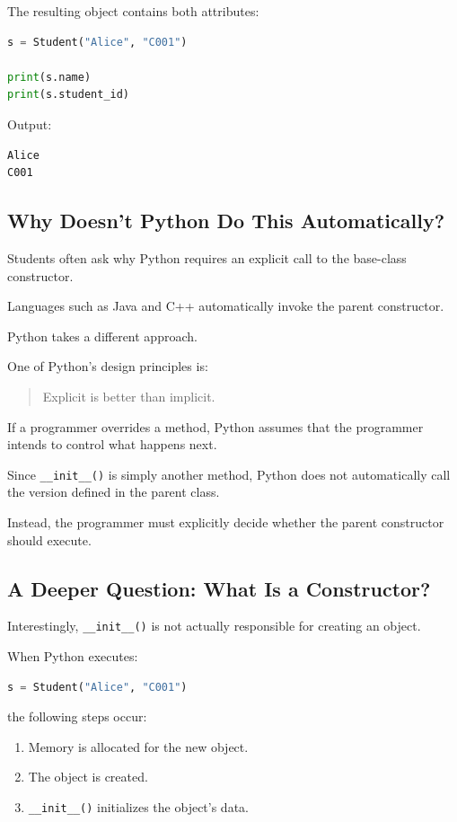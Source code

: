 \documentclass[11pt]{article}
\begin{document}
The resulting object contains both attributes:

\begin{lstlisting}[language=Python]
s = Student("Alice", "C001")

print(s.name)
print(s.student_id)
\end{lstlisting}

Output:

\begin{verbatim}
Alice
C001
\end{verbatim}

\subsection{Why Doesn’t Python Do This Automatically?}

Students often ask why Python requires an explicit call to the base-class constructor.

Languages such as Java and C++ automatically invoke the parent constructor.

Python takes a different approach.

One of Python’s design principles is:

\begin{quote}
Explicit is better than implicit.
\end{quote}

If a programmer overrides a method, Python assumes that the programmer intends to control what happens next.

Since \verb|__init__()| is simply another method, Python does not automatically call the version defined in the parent class.

Instead, the programmer must explicitly decide whether the parent constructor should execute.

\subsection{A Deeper Question: What Is a Constructor?}

Interestingly, \verb|__init__()| is not actually responsible for creating an object.

When Python executes:

\begin{lstlisting}[language=Python]
s = Student("Alice", "C001")
\end{lstlisting}

the following steps occur:

\begin{enumerate}
\item Memory is allocated for the new object.
\item The object is created.
\item \verb|__init__()| initializes the object’s data.
\end{enumerate}
\end{document}
